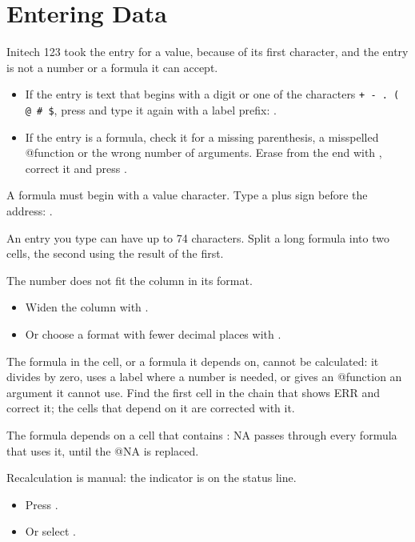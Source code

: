 \section{Entering Data}
\Solution Initech 123 took the entry for a value, because of its first
character, and the entry is not a number or a formula it can accept.
\begin{itemize}
\item If the entry is text that begins with a digit or one of the
  characters \texttt{+ - . ( @ \# \$}, press  and type it again
  with a label prefix: .
\item If the entry is a formula, check it for a missing parenthesis, a
  misspelled @function or the wrong number of arguments.  Erase from the end
  with , correct it and press .
\end{itemize}

\Solution A formula must begin with a value character.  Type a plus sign
before the address: .

\Solution An entry you type can have up to 74 characters.  Split a long
formula into two cells, the second using the result of the first.

\Solution The number does not fit the column in its format.
\begin{itemize}
\item Widen the column with .
\item Or choose a format with fewer decimal places with
  .
\end{itemize}

\Solution The formula in the cell, or a formula it depends on, cannot be
calculated: it divides by zero, uses a label where a number is needed, or
gives an @function an argument it cannot use.  Find the first cell in the
chain that shows ERR and correct it; the cells that depend on it are
corrected with it.

\Solution The formula depends on a cell that contains : NA passes
through every formula that uses it, until the @NA is replaced.

\Solution Recalculation is manual: the  indicator is on the status
line.
\begin{itemize}
\item Press .
\item Or select .
\end{itemize}

